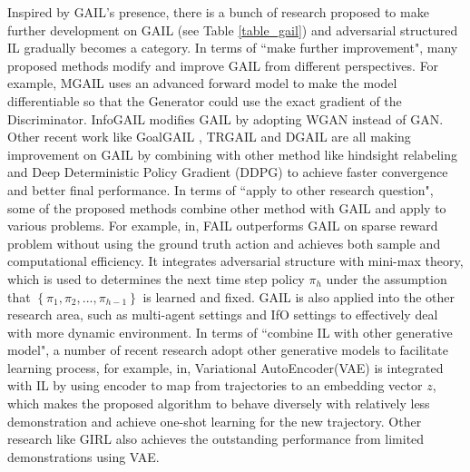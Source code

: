\documentclass[acmsmall]{acmart}
\begin{document}
Inspired by GAIL's presence, there is a bunch of research proposed to make further development on GAIL (see Table \ref{table_gail}) and adversarial structured IL gradually becomes a category.
In terms of ``make further improvement", many proposed methods modify and improve GAIL from different perspectives. For example, MGAIL\cite{baramEndtoEndDifferentiableAdversarial2017} uses an advanced forward model to make the model differentiable so that the Generator could use the exact gradient of the Discriminator. InfoGAIL\cite{liInfoGAILInterpretableImitation2017} modifies GAIL by adopting WGAN instead of GAN. Other recent work like GoalGAIL \cite{dingGoalconditionedImitationLearning2019}, TRGAIL\cite{kinoseIntegrationImitationLearning2020} and DGAIL\cite{zuoDeterministicGenerativeAdversarial2020} are all making improvement on GAIL by combining with other method like hindsight relabeling and Deep Deterministic Policy Gradient (DDPG) \cite{lillicrap2019continuous} to achieve faster convergence and better final performance.
In terms of ``apply to other research question", some of the proposed methods combine other method with GAIL and apply to various problems. For example, in\cite{sunProvablyEfficientImitation2019}, FAIL outperforms GAIL on sparse reward problem without using the ground truth action and achieves both sample and computational efficiency. It integrates adversarial structure with mini-max theory, which is used to determines the next time step policy $\pi_{h}$ under the assumption that $\left \{ \pi_{1}, \pi_{2},...,\pi_{h-1} \right \}$ is learned and fixed. GAIL is also applied into the other research area, such as multi-agent settings\cite{bhattacharyyaMultiAgentImitationLearning2018,songMultiAgentGenerativeAdversarial2018,zhanGeneratingMultiAgentTrajectories2019} and IfO settings\cite{torabiGenerativeAdversarialImitation2019} to effectively deal with more dynamic environment.
In terms of ``combine IL with other generative model", a number of recent research adopt other generative models to facilitate learning process, for example, in\cite{wangRobustImitationDiverse2017}, Variational AutoEncoder(VAE) is integrated with IL by using encoder to map from trajectories to an embedding vector $z$, which makes the proposed algorithm to behave diversely with relatively less demonstration and achieve one-shot learning for the new trajectory. Other research like GIRL\cite{yu2020intrinsic} also achieves the outstanding performance from limited demonstrations using VAE.
\end{document}
